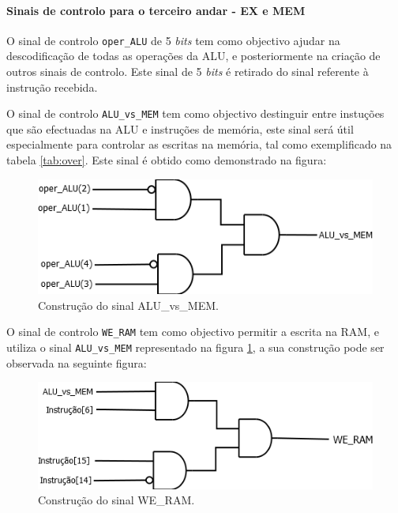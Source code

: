 \documentclass[11pt]{article}
\numberwithin{equation}{section}
\begin{document}
\paragraph{Sinais de controlo para o terceiro andar - EX e MEM}

O sinal de controlo \texttt{oper\_ALU} de 5 \textit{bits} tem como objectivo ajudar na descodificação de todas as operações da ALU, e posteriormente na criação de outros sinais de controlo. Este sinal de 5 \textit{bits} é retirado do sinal referente à instrução recebida. 

O sinal de controlo \texttt{ALU\_vs\_MEM} tem como objectivo destinguir entre instuções que são efectuadas na ALU e instruções de memória, este sinal será útil especialmente para controlar as escritas na memória, tal como exemplificado na tabela \ref{tab:over}. Este sinal é obtido como demonstrado na figura:

\begin{figure}[H]
	\centering
	\includegraphics[keepaspectratio=true, scale=0.6]{imagens/AluvsMem}
	\caption{Construção do sinal ALU\_vs\_MEM.}
	\vspace{-0.8em}
	\label{fig:AluvsMem}
\end{figure}

O sinal de controlo \texttt{WE\_RAM} tem como objectivo permitir a escrita na RAM, e utiliza o sinal \texttt{ALU\_vs\_MEM} representado na figura \ref{fig:AluvsMem}, a sua construção pode ser observada na seguinte figura:

\begin{figure}[H]
	\centering
	\includegraphics[keepaspectratio=true, scale=0.6]{imagens/WE_RAM}
	\caption{Construção do sinal WE\_RAM.}
	\vspace{-0.8em}
\end{figure}
\end{document}
